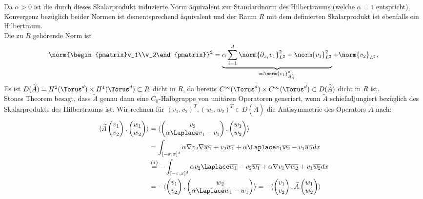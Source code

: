 Da $\alpha>0$ ist die durch dieses Skalarprodukt induzierte Norm äquivalent zur Standardnorm des Hilbertraums (welche $\alpha=1$ entspricht). Konvergenz bezüglich beider Normen ist dementsprechend äquivalent und der Raum $R$ mit dem definierten Skalarprodukt ist ebenfalls ein Hilbertraum.\\
Die zu $R$ gehörende Norm ist
\[\norm{\begin{pmatrix}v_1\\v_2\end{pmatrix}}^2=\underbrace{\alpha \sum_{i=1}^d\norm{\partial_{x_i} v_1}^2_{L^2}+\norm{v_1}_{L^2}^2}_{\eqqcolon\norm{v_1}^2_{H^1_\alpha}}+\norm{v_2}_{L^2}.\]
Es ist $D(\widetilde{A})=H^2(\Torus^d)\times H^1(\Torus^d)\subset R$ dicht in $R$, da bereits $C^\infty(\Torus^d)\times C^\infty(\Torus^d)\subset D(\widetilde{A})$ dicht in $R$ ist.\\
Stones Theorem besagt, dass $\widetilde{A}$ genau dann eine $C_0$-Halbgruppe von unitären Operatoren generiert, wenn $\widetilde{A}$ schiefadjungiert bezüglich des Skalarprodukts des Hilbertraums ist. Wir rechnen für $(v_1,v_2)^T, (w_1,w_2)^T\in D(\widetilde{A})$ die Antisymmetrie des Operators $\widetilde{A}$ nach:
\begin{align*}
\langle \widetilde{A}\begin{pmatrix}v_1\\v_2\end{pmatrix}, \begin{pmatrix}w_1\\w_2\end{pmatrix}\rangle
&=\langle \begin{pmatrix} v_2\\\alpha \Laplace v_1-v_1\end{pmatrix}, \begin{pmatrix}w_1\\w_2\end{pmatrix}\rangle\\
&=\int_{[-\pi,\pi]^d} \alpha \nabla v_2\nabla \overline{w_1} +v_2\overline{w_1}+ \alpha \Laplace v_1 \overline{w_2} - v_1\overline{w_2}dx\\
&\stackrel{(*)}{=}-\int_{[-\pi,\pi]^d}\alpha v_2\Laplace \overline{w_1}-v_2\overline{w_1}+ \alpha \nabla v_1\nabla \overline{w_2} + v_1\overline{w_2}dx\\
&=-\langle \begin{pmatrix} v_1\\ v_2\end{pmatrix}, \begin{pmatrix} w_2\\\alpha \Laplace w_1-w_1\end{pmatrix}\rangle=-\langle \begin{pmatrix}v_1\\v_2\end{pmatrix}, \widetilde{A}\begin{pmatrix}w_1\\w_2\end{pmatrix}\rangle
\end{align*}
